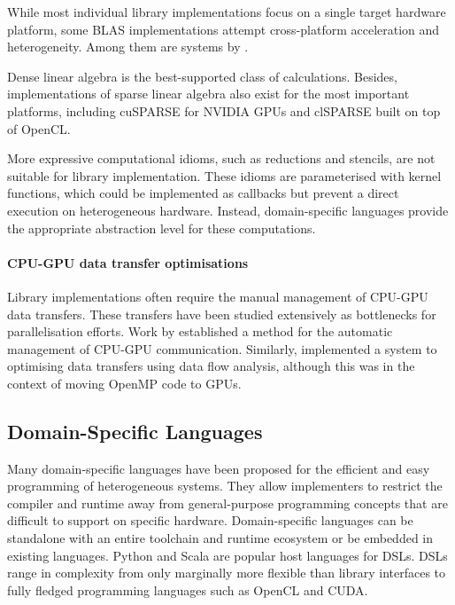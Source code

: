     While most individual library implementations focus on a single target
    hardware platform, some BLAS implementations attempt cross-platform
    acceleration and heterogeneity.
    Among them are systems by \citet{Wang:2016:BHP:2925426.2926256,
    10.1007/978-3-319-64203-1_33, Diego2017Multi}.

    Dense linear algebra is the best-supported class of calculations.
    Besides, implementations of sparse linear algebra also exist for
    the most important platforms, including cuSPARSE \cite{cusparse} for NVIDIA
    GPUs and clSPARSE \cite{clsparse} built on top of OpenCL.

    More expressive computational idioms, such as reductions and stencils, are
    not suitable for library implementation.
    These idioms are parameterised with kernel functions, which could be
    implemented as callbacks but prevent a direct execution on heterogeneous
    hardware.
    Instead, domain-specific languages provide the appropriate abstraction
    level for these computations.

    \paragraph*{CPU-GPU data transfer optimisations}
    Library implementations often require the manual management of CPU-GPU
    data transfers.
    These transfers have been studied extensively as bottlenecks for
    parallelisation efforts.
    Work by \citet{Jablin:2011:ACC:1993316.1993516} established a
    method for the automatic management of CPU-GPU communication.
    Similarly, \citet{Lee:2009:OGC:1594835.1504194} implemented a system to
    optimising data transfers using data flow analysis, although this was in
    the context of moving OpenMP code to GPUs.

\subsection{Domain-Specific Languages}

    Many domain-specific languages have been proposed for the efficient and
    easy programming of heterogeneous systems.
    They allow implementers to restrict the compiler and runtime away from
    general-purpose programming concepts that are difficult to support on
    specific hardware.
    Domain-specific languages can be standalone with an entire toolchain and
    runtime ecosystem or be embedded in existing languages.
    Python and Scala are popular host languages for DSLs.
    DSLs range in complexity from only marginally more flexible than library
    interfaces to fully fledged programming languages such as OpenCL and CUDA.

